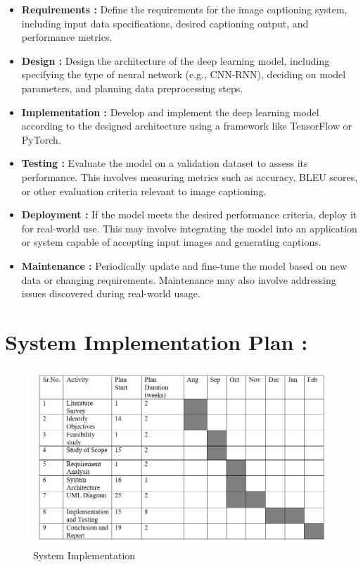 \documentclass[oneside,a4paper,12pt]{report}
\begin{document}
\begin{itemize}


\item{\textbf{Requirements :  }}
Define the requirements for the image captioning system, including input data specifications, desired captioning output, and performance metrics.
\item{\textbf{Design : }}
Design the architecture of the deep learning model, including specifying the type of neural network (e.g., CNN-RNN), deciding on model parameters, and planning data preprocessing steps.
\item{\textbf{Implementation : }}
Develop and implement the deep learning model according to the designed architecture using a framework like TensorFlow or PyTorch.
\item{\textbf{Testing : }}
Evaluate the model on a validation dataset to assess its performance. This involves measuring metrics such as accuracy, BLEU scores, or other evaluation criteria relevant to image captioning.
\item{\textbf{Deployment : }}
If the model meets the desired performance criteria, deploy it for real-world use. This may involve integrating the model into an application or system capable of accepting input images and generating captions.
\item{\textbf{Maintenance : }}
Periodically update and fine-tune the model based on new data or changing requirements. Maintenance may also involve addressing issues discovered during real-world usage.

\end{itemize}

\section{System Implementation Plan :}
\begin{figure}[H]
\begin{center}
\includegraphics[width=1.0\linewidth]{sys34}
\caption{System Implementation}
\label{Fig:f2}
\end{center}
\end{figure}
\end{document}
